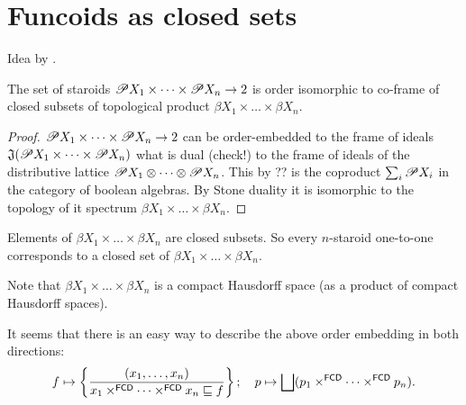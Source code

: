 \chapter{Funcoids as closed sets}

Idea \cite{nlab-topogeny} by .



\begin{thm}
The set of staroids
$\mathscr{P} X_1\times\dots\times\mathscr{P} X_n\to 2$ is
order isomorphic to co-frame of closed subsets of topological
product $\beta X_1\times\dots\times\beta X_n$.
\end{thm}

\begin{proof}
$\mathscr{P} X_1\times\dots\times\mathscr{P} X_n\to 2$ can be order-embedded to
the frame of ideals
$\mathfrak{J}(\mathscr{P} X_1\times\dots\times\mathscr{P} X_n)$ what is
dual (check!) to the frame of ideals of the distributive lattice
$\mathscr{P} X_1\otimes\dots\otimes\mathscr{P} X_n$.
This by ?? is the coproduct $\sum_i \mathscr{P} X_i$ in the category
of boolean algebras.
By Stone duality it is isomorphic to the topology of it spectrum
$\beta X_1\times\dots\times\beta X_n$.
\end{proof}

Elements of $\beta X_1\times\dots\times\beta X_n$ are closed
subsets. So every $n$-staroid one-to-one corresponds to a closed
set of $\beta X_1\times\dots\times\beta X_n$.

Note that $\beta X_1\times\dots\times\beta X_n$ is a compact
Hausdorff space (as a product of compact Hausdorff spaces).

It seems that there is an easy way to describe the above order
embedding in both directions:
\[
f\mapsto
\setcond{(x_1,\dots,x_n)}{
x_1\times^{\mathsf{FCD}}\dots\times^{\mathsf{FCD}}x_n\sqsubseteq f};\quad
p\mapsto \bigsqcup(p_1\times^{\mathsf{FCD}}\dots\times^{\mathsf{FCD}}p_n).
\]

